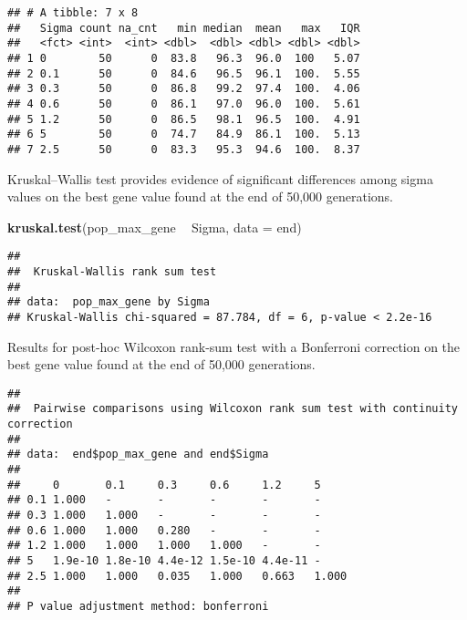 \documentclass[]{book}
\newenvironment{Shaded}{\begin{snugshade}}{\end{snugshade}}
\newcommand{\DataTypeTok}[1]{\textcolor[rgb]{0.13,0.29,0.53}{#1}}
\newcommand{\KeywordTok}[1]{\textcolor[rgb]{0.13,0.29,0.53}{\textbf{#1}}}
\newcommand{\NormalTok}[1]{#1}
\newcommand{\OperatorTok}[1]{\textcolor[rgb]{0.81,0.36,0.00}{\textbf{#1}}}
\newcommand{\OtherTok}[1]{\textcolor[rgb]{0.56,0.35,0.01}{#1}}
\newcommand{\StringTok}[1]{\textcolor[rgb]{0.31,0.60,0.02}{#1}}
\begin{document}
\begin{verbatim}
## # A tibble: 7 x 8
##   Sigma count na_cnt   min median  mean   max   IQR
##   <fct> <int>  <int> <dbl>  <dbl> <dbl> <dbl> <dbl>
## 1 0        50      0  83.8   96.3  96.0  100   5.07
## 2 0.1      50      0  84.6   96.5  96.1  100.  5.55
## 3 0.3      50      0  86.8   99.2  97.4  100.  4.06
## 4 0.6      50      0  86.1   97.0  96.0  100.  5.61
## 5 1.2      50      0  86.5   98.1  96.5  100.  4.91
## 6 5        50      0  74.7   84.9  86.1  100.  5.13
## 7 2.5      50      0  83.3   95.3  94.6  100.  8.37
\end{verbatim}

Kruskal--Wallis test provides evidence of significant differences among sigma values on the best gene value found at the end of 50,000 generations.

\begin{Shaded}
\begin{Highlighting}[]
\KeywordTok{kruskal.test}\NormalTok{(pop_max_gene }\OperatorTok{~}\StringTok{ }\NormalTok{Sigma, }\DataTypeTok{data =}\NormalTok{ end)}
\end{Highlighting}
\end{Shaded}

\begin{verbatim}
## 
##  Kruskal-Wallis rank sum test
## 
## data:  pop_max_gene by Sigma
## Kruskal-Wallis chi-squared = 87.784, df = 6, p-value < 2.2e-16
\end{verbatim}

Results for post-hoc Wilcoxon rank-sum test with a Bonferroni correction on the best gene value found at the end of 50,000 generations.

\begin{Shaded}
\end{Shaded}

\begin{verbatim}
## 
##  Pairwise comparisons using Wilcoxon rank sum test with continuity correction 
## 
## data:  end$pop_max_gene and end$Sigma 
## 
##     0       0.1     0.3     0.6     1.2     5    
## 0.1 1.000   -       -       -       -       -    
## 0.3 1.000   1.000   -       -       -       -    
## 0.6 1.000   1.000   0.280   -       -       -    
## 1.2 1.000   1.000   1.000   1.000   -       -    
## 5   1.9e-10 1.8e-10 4.4e-12 1.5e-10 4.4e-11 -    
## 2.5 1.000   1.000   0.035   1.000   0.663   1.000
## 
## P value adjustment method: bonferroni
\end{verbatim}
\end{document}
